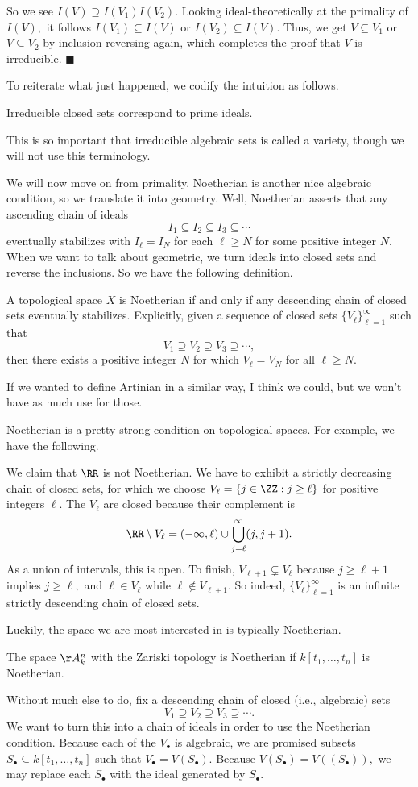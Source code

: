 So we see $I(V)\supseteq I(V_1)I(V_2).$ Looking ideal-theoretically at the primality of $I(V),$ it follows $I(V_1)\subseteq I(V)$ or $I(V_2)\subseteq I(V).$ Thus, we get $V\subseteq V_1$ or $V\subseteq V_2$ by inclusion-reversing again, which completes the proof that $V$ is irreducible. $\blacksquare$

To reiterate what just happened, we codify the intuition as follows.
\begin{idea}
    Irreducible closed sets correspond to prime ideals.
\end{idea}
This is so important that irreducible algebraic sets is called a variety, though we will not use this terminology.

We will now move on from primality. Noetherian is another nice algebraic condition, so we translate it into geometry. Well, Noetherian asserts that any ascending chain of ideals
\[I_1\subseteq I_2\subseteq I_3\subseteq\cdots\]
eventually stabilizes with $I_\ell=I_N$ for each $\ell\ge N$ for some positive integer $N.$ When we want to talk about geometric, we turn ideals into closed sets and reverse the inclusions. So we have the following definition.
\begin{definition}
    A topological space $X$ is Noetherian if and only if any descending chain of closed sets eventually stabilizes. Explicitly, given a sequence of closed sets $\{V_\ell\}_{\ell=1}^\infty$ such that
    \[V_1\supseteq V_2\supseteq V_3\supseteq\cdots,\]
    then there exists a positive integer $N$ for which $V_\ell=V_N$ for all $\ell\ge N.$
\end{definition}
If we wanted to define Artinian in a similar way, I think we could, but we won't have as much use for those.

Noetherian is a pretty strong condition on topological spaces. For example, we have the following.
\begin{example}
    We claim that $\RR$ is not Noetherian. We have to exhibit a strictly decreasing chain of closed sets, for which we choose $V_\ell=\{j\in\ZZ:j\ge\ell\}$ for positive integers $\ell.$ The $V_\ell$ are closed because their complement is
    \[\RR\setminus V_\ell=(-\infty,\ell)\cup\bigcup_{j=\ell}^\infty(j,j+1).\]
    As a union of intervals, this is open. To finish, $V_{\ell+1}\subsetneq V_\ell$ because $j\ge\ell+1$ implies $j\ge\ell,$ and $\ell\in V_\ell$ while $\ell\notin V_{\ell+1}.$ So indeed, $\{V_\ell\}_{\ell=1}^\infty$ is an infinite strictly descending chain of closed sets.
\end{example}
Luckily, the space we are most interested in is typically Noetherian.
\begin{proposition}
    The space $\AA_k^n$ with the Zariski topology is Noetherian if $k[t_1,\ldots,t_n]$ is Noetherian.
\end{proposition}
Without much else to do, fix a descending chain of closed (i.e., algebraic) sets
\[V_1\supseteq V_2\supseteq V_3\supseteq\cdots.\]
We want to turn this into a chain of ideals in order to use the Noetherian condition. Because each of the $V_\bullet$ is algebraic, we are promised subsets $S_\bullet\subseteq k[t_1,\ldots,t_n]$ such that $V_\bullet=V(S_\bullet).$ Because $V(S_\bullet)=V((S_\bullet)),$ we may replace each $S_\bullet$ with the ideal generated by $S_\bullet.$

